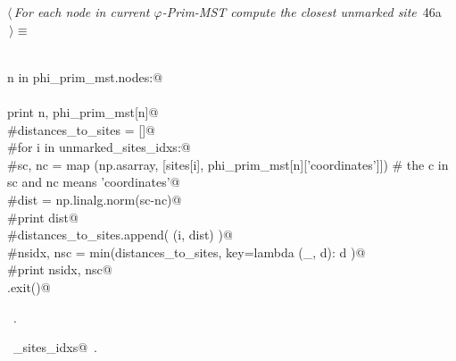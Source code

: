 \documentclass[11.5pt]{report}
\begin{document}
\vspace{-0.8cm}\newchunk
\begin{flushleft} \small
\begin{minipage}{\linewidth}\label{scrap67}\raggedright\small
{} $\langle\,${\itshape For each node in current $\varphi$-Prim-MST compute the closest unmarked site}\nobreak\ {\footnotesize {46a}}$\,\rangle\equiv$
\vspace{-1ex}
\begin{list}{}{} \item
\mbox{}\verb@@\\
\mbox{}\verb@for n in phi_prim_mst.nodes:@\\
\mbox{}\verb@@\\
\mbox{}\verb@     print n, phi_prim_mst[n]@\\
\mbox{}\verb@     #distances_to_sites = []@\\
\mbox{}\verb@     #for i in unmarked_sites_idxs:@\\
\mbox{}\verb@          #sc, nc = map (np.asarray, [sites[i], phi_prim_mst[n]['coordinates']]) # the c in sc and nc means 'coordinates'@\\
\mbox{}\verb@          #dist =  np.linalg.norm(sc-nc)@\\
\mbox{}\verb@          #print dist@\\
\mbox{}\verb@          #distances_to_sites.append( (i, dist) )@\\
\mbox{}\verb@     #nsidx, nsc = min(distances_to_sites, key=lambda (_, d): d )@\\
\mbox{}\verb@     #print nsidx, nsc@\\
\mbox{}\verb@sys.exit()@\\
\mbox{}\verb@@{\NWsep}
\end{list}
\vspace{-1.5ex}
\footnotesize
\begin{list}{}{\setlength{\itemsep}{-\parsep}\setlength{\itemindent}{-\leftmargin}}
\item \NWtxtMacroRefIn\ .
\item \NWtxtIdentsUsed\nobreak\  \verb@unmarked_sites_idxs@\nobreak\ .
\item{}
\end{list}
\end{minipage}\vspace{4ex}
\end{flushleft}
\end{document}
